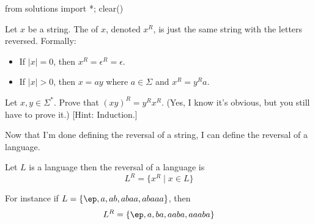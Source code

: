 \begin{python0}
from solutions import *; clear()
\end{python0}

\begin{defn}
Let $x$ be a string. The  of $x$, denoted $x^R$,
is just the same string with the letters reversed. Formally:
\begin{itemize}
 \item If $|x|=0$, then $x^R = \epsilon^R = \epsilon$.
 \item If $|x|>0$, then $x = ay$ where $a \in \Sigma$ and $x^R =
 y^Ra$.
\end{itemize}
\end{defn}


\newpage
\begin{ex}
Let $x,y \in \Sigma^*$. Prove that $(xy)^R = y^Rx^R$. (Yes, I know
it's obvious, but you still have to prove it.) [Hint: Induction.]
\end{ex}

\newpage
Now that I'm done defining the reversal of a string, I can
define the reversal of a language.

\begin{defn}
Let $L$ is a language then the reversal of a language is
\[
L^R = \{x^R \mid x \in L \}
\]
\end{defn}

For instance if $L = \{\ep, a, ab, abaa, abaaa\}$, then
\[
L^R = \{ \ep, a, ba, aaba, aaaba \}
\]

